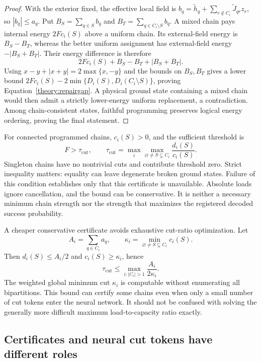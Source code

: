 \documentclass[11pt,a4paper]{article}
\theoremstyle{definition}\newtheorem{definition}[proposition]{Definition}
\begin{document}
\begin{proof}
With the exterior fixed, the effective local field is
$b_q=\widetilde h_q+\sum_{r\notin C_i}\widetilde J_{qr}z_r$, so $|b_q|\le a_q$. Put $B_S=\sum_{q\in S}b_q$ and $B_T=\sum_{q\in C_i\setminus S}b_q$. A mixed chain pays internal energy $2F c_i(S)$ above a uniform chain. Its external-field energy is $B_S-B_T$, whereas the better uniform assignment has external-field energy $-|B_S+B_T|$. Their energy difference is therefore
\[
 2F c_i(S)+B_S-B_T+|B_S+B_T|.
\]
Using $x-y+|x+y|=2\max\{x,-y\}$ and the bounds on $B_S,B_T$ gives a lower bound
$2F c_i(S)-2\min\{D_i(S),D_i(C_i\setminus S)\}$, proving Equation~\eqref{theory:repairgap}. A physical ground state containing a mixed chain would then admit a strictly lower-energy uniform replacement, a contradiction. Among chain-consistent states, faithful programming preserves logical energy ordering, proving the final statement.
\end{proof}

For connected programmed chains, $c_i(S)>0$, and the sufficient threshold is
\[
 F>\tau_{\mathrm{cut}},\qquad
 \tau_{\mathrm{cut}}=\max_i\max_{\varnothing\ne S\subsetneq C_i}
                       \frac{d_i(S)}{c_i(S)}.
\]
Singleton chains have no nontrivial cuts and contribute threshold zero. Strict inequality matters: equality can leave degenerate broken ground states. Failure of this condition establishes only that this certificate is unavailable. Absolute loads ignore cancellation, and the bound can be conservative. It is neither a necessary minimum chain strength nor the strength that maximizes the registered decoded success probability.

A cheaper conservative certificate avoids exhaustive cut-ratio optimization. Let
\[
 A_i=\sum_{q\in C_i}a_q,
 \qquad \kappa_i=\min_{\varnothing\ne S\subsetneq C_i}c_i(S).
\]
Then $d_i(S)\le A_i/2$ and $c_i(S)\ge\kappa_i$, hence
\begin{equation}
 \tau_{\mathrm{cut}}
 \le\max_{i:|C_i|>1}\frac{A_i}{2\kappa_i}.
 \label{theory:mincutcertificate}
\end{equation}
The weighted global minimum cut $\kappa_i$ is computable without enumerating all bipartitions. This bound can certify some chains even when only a small number of cut tokens enter the neural network. It should not be confused with solving the generally more difficult maximum load-to-capacity ratio exactly.

\subsection{Certificates and neural cut tokens have different roles}
\label{theory:tiers}
\end{document}
